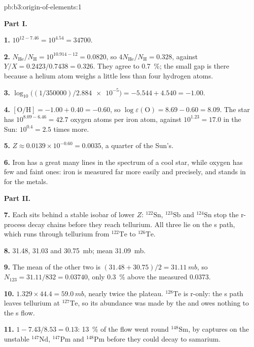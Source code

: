 \begin{solution}{pb:b3:origin-of-elements:1}

\textbf{Part I.}

\textbf{1.} $10^{12 - 7.46} = 10^{4.54} = \num{34700}$.

\textbf{2.} $N_\mathrm{He}/N_\mathrm{H} = 10^{10.914 - 12} = \num{0.0820}$, so
$4N_\mathrm{He}/N_\mathrm{H} = \num{0.328}$, against $Y/X =
0.2423/0.7438 = \num{0.326}$. They agree to \qty{0.7}{\percent}; the
small gap is there because a helium atom weighs a little less than four
hydrogen atoms.

\textbf{3.} $\log_{10}\bigl((1/350000)/\num{2.884e-5}\bigr) = -5.544 + 4.540 =
-1.00$.

\textbf{4.} $[\mathrm{O/H}] = -1.00 + 0.40 = -0.60$, so
$\log\varepsilon(\mathrm{O}) = 8.69 - 0.60 = 8.09$. The star has
$10^{8.09 - 6.46} = 42.7$ oxygen atoms per iron atom, against
$10^{1.23} = 17.0$ in the Sun: $10^{0.4} = 2.5$ times more.

\textbf{5.} $Z \approx 0.0139\times10^{-0.60} = \num{0.0035}$, a quarter of the
Sun's.

\textbf{6.} Iron has a great many lines in the spectrum of a cool star, while
oxygen has few and faint ones: iron is measured far more easily and
precisely, and stands in for the metals.

\textbf{Part II.}

\textbf{7.} Each sits behind a stable isobar of lower $Z$:
$^{122}\mathrm{Sn}$, $^{123}\mathrm{Sb}$ and $^{124}\mathrm{Sn}$ stop
the r-process decay chains before they reach tellurium. All three lie
on the s path, which runs through tellurium from $^{122}\mathrm{Te}$ to
$^{126}\mathrm{Te}$.

\textbf{8.} \num{31.48}, \num{31.03} and \qty{30.75}{mb}; mean
\qty{31.09}{mb}.

\textbf{9.} The mean of the other two is $(31.48 + 30.75)/2 = \qty{31.11}{mb}$,
so $N_{123} = 31.11/832 = \num{0.03740}$, only \qty{0.3}{\percent}
above the measured \num{0.0373}.

\textbf{10.} $1.329\times44.4 = \qty{59.0}{mb}$, nearly twice the plateau.
$^{128}\mathrm{Te}$ is r-only: the s path leaves tellurium at
$^{127}\mathrm{Te}$, so its abundance was made by the  and
owes nothing to the s flow.

\textbf{11.} $1 - 7.43/8.53 = \num{0.13}$: \qty{13}{\percent} of the flow went
round $^{148}\mathrm{Sm}$, by captures on the unstable
$^{147}\mathrm{Nd}$, $^{147}\mathrm{Pm}$ and $^{148}\mathrm{Pm}$ before
they could decay to samarium.


\end{solution}
